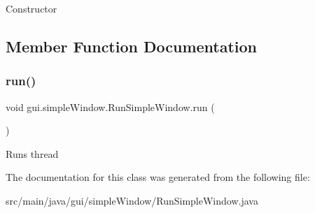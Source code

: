 Constructor 

\subsection{Member Function Documentation}
\mbox{\label{classgui_1_1simple_window_1_1_run_simple_window_ad80b6825105574d0a327c90580869957}} 
\subsubsection{\texorpdfstring{run()}{run()}}
{\footnotesize\ttfamily void gui.\+simple\+Window.\+Run\+Simple\+Window.\+run (\begin{DoxyParamCaption}{ }\end{DoxyParamCaption})}

Runs thread 

The documentation for this class was generated from the following file\+:\begin{DoxyCompactItemize}
\item 
src/main/java/gui/simple\+Window/Run\+Simple\+Window.\+java\end{DoxyCompactItemize}
